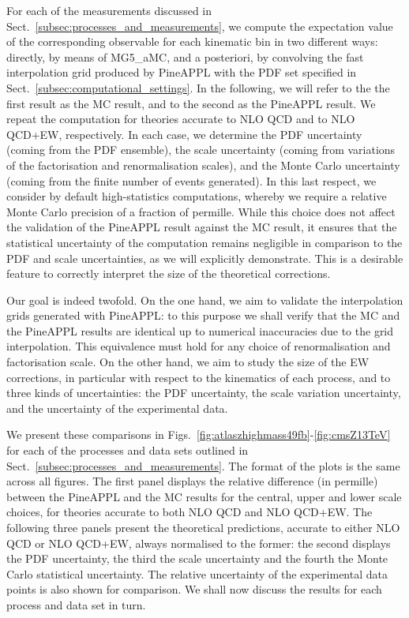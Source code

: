 For each of the measurements discussed in
Sect.~\ref{subsec:processes_and_measurements}, we compute the expectation
value of the corresponding observable for each kinematic bin in two different
ways: directly, by means of {\sc MG5\_aMC}, and a posteriori, by convolving the
fast interpolation grid produced by {\sc PineAPPL} with the PDF set specified
in Sect.~\ref{subsec:computational_settings}. In the following, we will refer
to the the first result as the {\sc MC} result, and to the second as the
{\sc PineAPPL} result. We repeat the computation for theories accurate to NLO
QCD and to NLO QCD+EW, respectively. In each case, we determine the PDF
uncertainty (coming from the PDF ensemble), the scale uncertainty (coming from
variations of the factorisation and renormalisation scales), and the Monte
Carlo uncertainty (coming from the finite number of events generated). In this
last respect, we consider by default high-statistics computations, whereby we
require a relative Monte Carlo precision of a fraction of permille. While
this choice does not affect the validation of the {\sc PineAPPL} result against
the {\sc MC} result, it ensures that the statistical uncertainty of the
computation remains negligible in comparison to the PDF and scale uncertainties,
as we will explicitly demonstrate. This is a desirable feature to correctly
interpret the size of the theoretical corrections.

Our goal is indeed twofold. On the one hand, we aim to validate the
interpolation grids generated with {\sc PineAPPL}: to this purpose we shall
verify that the MC and the {\sc PineAPPL} results are identical up to numerical
inaccuracies due to the grid interpolation. This equivalence must hold for any
choice of renormalisation and factorisation scale. On the other hand, we aim to
study the size of the EW corrections, in particular with respect to the
kinematics of each process, and to three kinds of uncertainties: the PDF
uncertainty, the scale variation uncertainty, and the uncertainty of the
experimental data.

We present these comparisons in
Figs.~\ref{fig:atlaszhighmass49fb}-\ref{fig:cmsZ13TeV} for each of the processes
and data sets outlined in Sect.~\ref{subsec:processes_and_measurements}.
The format of the plots is the same across all figures. The first panel
displays the relative difference (in permille) between the {\sc PineAPPL} and
the {\sc MC} results for the central, upper and lower scale choices, for
theories accurate to both NLO QCD and NLO QCD+EW. The following three panels
present the theoretical predictions, accurate to either NLO QCD or NLO QCD+EW,
always normalised to the former: the second displays the PDF uncertainty, the
third the scale uncertainty and the fourth the Monte Carlo statistical
uncertainty. The relative uncertainty of the experimental data points is also
shown for comparison. We shall now discuss the results for each
process and data set in turn.

